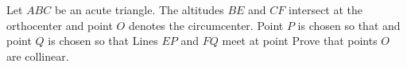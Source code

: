 Let $ABC$ be an acute triangle. The altitudes $BE$ and $CF$ intersect at the orthocenter  and point $O$ denotes the circumcenter. Point $P$ is chosen so that  and point $Q$ is chosen so that  Lines $EP$ and $FQ$ meet at point  Prove that points   $O$ are collinear.